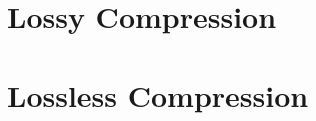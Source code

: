 \documentclass{these-dbl}
\begin{document}






%


\renewcommand{\contentsname}{Table of Contents}
\tableofcontents %

\clearemptydoublepage






\clearemptydoublepage
\part{Lossy Compression}


\part{Lossless Compression}

\clearemptydoublepage
\backmatter

\end{document}
